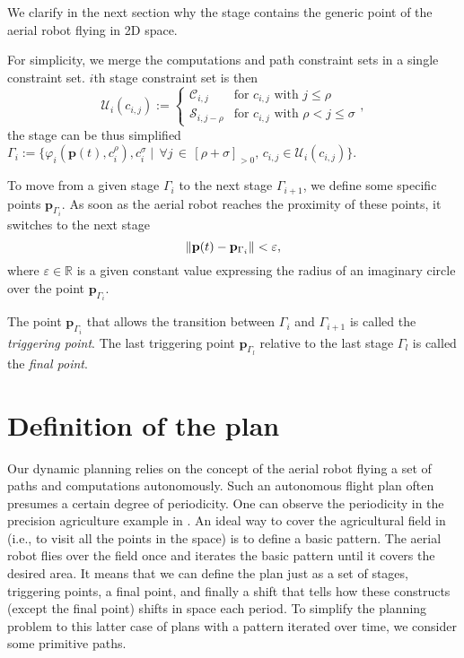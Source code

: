 We clarify in the next section why the stage contains the generic point of the aerial robot flying in 2D space.

For simplicity, we merge the computations and path constraint sets in a single constraint set. $i$th stage constraint set is then
\begin{equation}\label{eq:constraint-set}
  \mathcal{U}_i(c_{i,j}):=\begin{cases}
  \mathcal{C}_{i,j} & \text{for } c_{i,j} \text{ with } j\leq\rho\\
  \mathcal{S}_{i,j-\rho} & \text{for } c_{i,j} \text{ with } \rho<j\leq\sigma
\end{cases},\end{equation}
the stage can be thus simplified $\Gamma_i:=\{\varphi_i(\mathbf{p}(t),c_i^\rho),c_i^\sigma\mid \,\forall j\,\in\,[\rho+\sigma]_{>0},\,c_{i,j}\in\mathcal{U}_i(c_{i,j})\}$.


To move from a given stage $\Gamma_i$ to the next stage $\Gamma_{i+1}$, we define some specific points $\mathbf{p}_{\Gamma_i}$. As soon as the aerial robot reaches the proximity of these points, it switches to the next stage
\begin{equation}\label{eq:trig-vareps}
  \left\lVert\mathbf{p}(t)-\mathbf{p}_{\Gamma_i}\right\rVert<\varepsilon,
\end{equation}
where $\varepsilon\in\mathbb{R}$ is a given constant value expressing the radius of an imaginary circle over the point $\mathbf{p}_{\Gamma_i}$.

\begin{defn}
  \label{def:trigs}
  The point $\mathbf{p}_{\Gamma_{i}}$ that allows the transition between $\Gamma_i$ and $\Gamma_{i+1}$ is called the \emph{triggering point}. The last triggering point $\mathbf{p}_{\Gamma_{l}}$ relative to the last stage $\Gamma_l$ is called the \emph{final point}.
\end{defn}


\section{Definition of the plan}
\label{sec:plan}

Our dynamic planning relies on the concept of the aerial robot flying a set of paths and computations autonomously. Such an autonomous flight plan often presumes a certain degree of periodicity. One can observe the periodicity in the precision agriculture example in . An ideal way to cover the agricultural field in  (i.e., to visit all the points in the space) is to define a basic pattern. The aerial robot flies over the field once and iterates the basic pattern until it covers the desired area. It means that we can define the plan just as a set of stages, triggering points, a final point, and finally a shift that tells how these constructs (except the final point) shifts in space each period. To simplify the planning problem to this latter case of plans with a pattern iterated over time, we consider some primitive paths.

